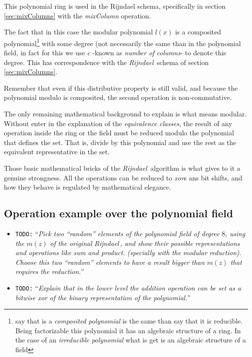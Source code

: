 \documentclass[10pt,a4paper,twoside]{llncs}
\newcommand{\todo}[1]{\texttt{\color{red}TODO:} ``\emph{#1}''}
\newcommand{\rijndael}{\emph{Rijndael}}
\begin{document}
This polynomial ring is used in the Rijndael schema, specifically in section \ref{sec:mixColumns} with the \emph{mixColumn} operation.

The fact that in this case the modular polynomial $l(x)$ is a composited polynomial\footnote{say that is a \emph{composited polynomial} is the same than say that it is reducible. Being factorizable this polynomial it has an algebraic structure of a ring. In the case of an \emph{irreducible polynomial} what is get is an algebraic structure of a field} with some degree (not necessarily the same than in the polynomial field, in fact for this we use \emph{c} -known as \emph{number of columns}- to denote this degree. This has correspondence with the \rijndael\, schema of section \ref{sec:mixColumns}.

Remember that even if this distributive property is still valid, and because the polynomial modulo is composited, the second operation is non-commutative.

The only remaining mathematical background to explain is what means modular. Without enter in the explanation of the \emph{equivalence classes}, the result of any operation inside the ring or the field must be reduced modulo the polynomial that defines the set. That is, divide by this polynomial and use the rest as the equivalent representative in the set.

Those basic mathematical bricks of the \rijndael\, algorithm is what gives to it a genuine strongness. All the operations can be reduced to \emph{xor}s ans bit shifts, and how they behave is regulated by mathematical elegance. 

\subsection{Operation example over the polynomial field}\label{sec:polynomialField}

\begin{itemize}
 \item \todo{Pick two ``random'' elements of the polynomial field of degree $8$, using the $m(z)$ of the original \rijndael\,, and show their possible representations and operations like sum and product. (specially with the modular reduction). Choose this two ``random'' elements to have a result bigger than $m(z)$ that requires the reduction.}
 \item \todo{Explain that in the lower level the addition operation can be set as a bitwise \emph{xor} of the binary representation of the polynomial.}
\end{itemize}
\end{document}
